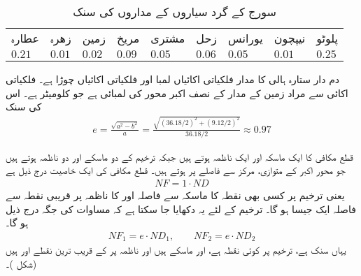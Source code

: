 \begin{table}
\caption{سورج کے گرد سیاروں کے مداروں کی سنک}
\label{جدول_مخروط_سنک}
\centering
\begin{tabular}{lllllllll}
\toprule
عطارہ&زھرہ&زمین&مریخ&مشتری&زحل&یورانس&نیپچون&پلوٹو\\
 $0.21$&$0.01$&$0.02$&$0.09$&$0.05$&$0.06$&$0.05$&$0.01$&$0.25$\\
\bottomrule
\end{tabular}
\end{table}

دم دار ستارہ ہالی کا مدار  فلکیاتی اکائیاں لمبا اور  فلکیاتی اکائیاں چوڑا ہے۔ فلکیاتی اکائی سے مراد زمین کے مدار کے نصف  اکبر محور کی لمبائی ہے جو  کلومیٹر ہے۔ اس کی سنک
\begin{align*}
e=\frac{\sqrt{a^2-b^2}}{a}=\frac{\sqrt{(36.18/2)^2+(9.12/2)^2}}{36.18/2}\approx 0.97
\end{align*}

قطع مکافی کا ایک ماسکہ اور ایک ناظمہ ہوتے ہیں جبکہ ترخیم کے دو ماسکے اور دو ناظمہ ہوتے ہیں جو محور اکبر کے متوازی، مرکز سے  فاصلے پر ہوتے ہیں۔ قطع مکافی کی ایک خاصیت درج ذیل ہے
\begin{align}\label{مساوات_مخروط_قطع_مکافی_خاصیت_الف}
NF=1\cdot ND
\end{align}
یعنی ترخیم پر کسی بھی نقطہ  کا ماسکہ سے فاصلہ  اور  کا ناظمہ پر قریبی نقطہ  سے  فاصلہ ایک جیسا ہو گا۔  ترخیم کے لئے یہ دکھایا جا سکتا ہے کہ  مساوات  کی جگہ درج ذیل ہو گا۔
\begin{align}\label{مساوات_مخروط_ترخیم_خاصیت_الف}
NF_1=e\cdot ND_1,\quad \quad NF_2=e\cdot ND_2
\end{align}
یہاں  سنک ہے،  ترخیم پر کوئی نقطہ ہے،  اور  ماسکے ہیں اور ناظمہ پر  کے قریب ترین نقطے    اور   ہیں (شکل )۔

